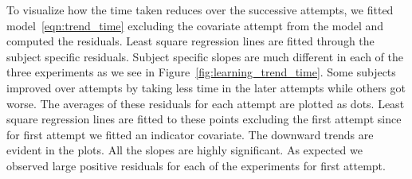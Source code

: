 \documentclass[10pt]{article}\usepackage[]{graphicx}\usepackage[]{xcolor}
\begin{document}
% 


To visualize how the time taken reduces over the successive attempts, we fitted model~\eqref{eqn:trend_time} excluding the covariate attempt from the model and computed the residuals. Least square regression lines are fitted through the subject specific residuals. Subject specific slopes are much different in each of the three experiments as we see in Figure~\ref{fig:learning_trend_time}. Some subjects improved over attempts by taking less time in the later attempts while others got worse. The averages of these residuals for each attempt are plotted as dots. Least square regression lines are fitted to these points excluding the first attempt since for first attempt we fitted an indicator covariate. The downward trends are evident in the plots. All the slopes are highly significant. As expected we observed large positive residuals for each of the experiments for first attempt. 
\end{document}
